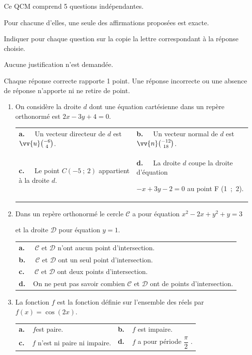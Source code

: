 \medskip

Ce QCM comprend 5 questions indépendantes.

Pour chacune d'elles, une seule des affirmations proposées est exacte.
 
Indiquer pour chaque question sur la copie la lettre correspondant à la réponse choisie.

 Aucune justification n'est demandée.
 
Chaque réponse correcte rapporte 1 point. Une réponse incorrecte ou une absence de réponse n'apporte ni ne retire de point.

\begin{enumerate}
\item On considère la droite $d$ dont une équation cartésienne dans un repère orthonormé est $2x-3y+4=0$.

\begin{tabularx}{\linewidth}{*{2}{X}}
\textbf{a.~~} Un vecteur directeur de $d$ est $\vv{u} \binom{-6}{4}$. &\textbf{b.~~} Un vecteur normal de $d$ est $\vv{n}\binom{-12}{18}$. \\
\textbf{c.~~} Le point $ C(-5~;~2)$ appartient à la droite $d$.& \textbf{d.~~} La droite $d$ coupe la droite d'équation 

$-x+3y-2=0$ au point F (1~;~2).
\end{tabularx}

\item Dans un repère orthonormé le cercle $\mathcal{C}$ a pour équation $x^2-2x+y^2+y=3$ 

et la droite $\mathcal{D}$ pour équation $y=1$.


\begin{tabularx}{\linewidth}{*{1}{X}}
\textbf{a.~~} $\mathcal{C}$ et $\mathcal{D}$ n'ont aucun point d'intersection.\\
\textbf{b.~~} $\mathcal{C}$ et $\mathcal{D}$ ont un seul point d'intersection.\\
\textbf{c.~~} $\mathcal{C}$ et $\mathcal{D}$ ont deux points d'intersection.\\
\textbf{d.~~}On ne peut pas savoir combien $\mathcal{C}$ et $\mathcal{D}$ ont de points d'intersection.\\
\end{tabularx}

\item La fonction $f$ est la fonction définie sur l'ensemble des réels par $f(x)= \cos(2x)$.

\begin{tabularx}{\linewidth}{*{2}{X}}
\textbf{a.~~}$f $est paire.  &\textbf{b.~~}$f$ est impaire. \\\textbf{c.~~}$f$ n'est ni paire ni impaire.& \textbf{d.~~}$f$ a pour période $\dfrac{\pi}{2}$ .
\end{tabularx}


\end{enumerate}
